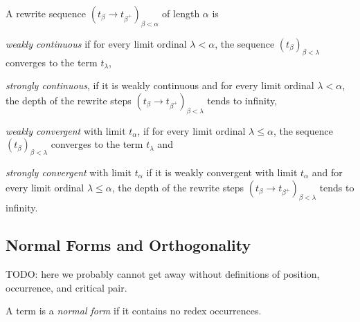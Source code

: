 \begin{definition}%
A rewrite sequence $(t_\beta \rightarrow t_{\beta^+})_{\beta < \alpha}$ of
length $\alpha$ is
\begin{compactenum}
  \item
    \emph{weakly continuous} if for every limit ordinal $\lambda < \alpha$,
    the sequence $(t_\beta)_{\beta < \lambda}$ converges to the term
    $t_\lambda$,
  \item
    \emph{strongly continuous}, if it is weakly continuous and for every limit
    ordinal $\lambda < \alpha$, the depth of the rewrite steps $(t_\beta
    \rightarrow t_{\beta^+})_{\beta < \lambda}$ tends to infinity,
  \item
    \emph{weakly convergent} with limit $t_\alpha$, if for every limit ordinal
    $\lambda \leq \alpha$, the sequence $(t_\beta)_{\beta < \lambda}$
    converges to the term $t_\lambda$ and
  \item
    \emph{strongly convergent} with limit $t_\alpha$ if it is weakly
    convergent with limit $t_\alpha$ and for every limit ordinal $\lambda \leq
    \alpha$, the depth of the rewrite steps $(t_\beta \rightarrow
    t_{\beta^+})_{\beta < \lambda}$ tends to infinity.
\end{compactenum}
\end{definition}



\subsection{Normal Forms and Orthogonality}

TODO: here we probably cannot get away without definitions of position,
occurrence, and critical pair.

A term is a \emph{normal form} if it contains no redex occurrences.



